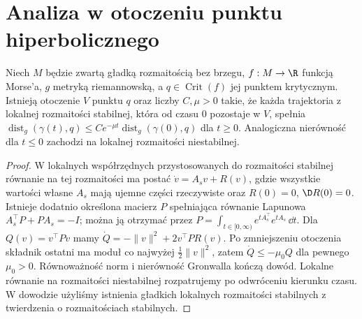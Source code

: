 \section{Analiza w otoczeniu punktu hiperbolicznego}
\begin{lemat}
\label{lem:morse-exponential-v11}
Niech $M$ będzie zwartą gładką rozmaitością bez brzegu,
$f:M\to\R$ funkcją Morse'a, $g$ metryką riemannowską,
a $q\in\operatorname{Crit}(f)$ jej punktem krytycznym.
Istnieją otoczenie $V$ punktu $q$ oraz liczby $C,\mu>0$
takie, że każda trajektoria z lokalnej rozmaitości stabilnej,
która od czasu $0$ pozostaje w $V$, spełnia
$\operatorname{dist}_g(\gamma(t),q)\le
C e^{-\mu t}\operatorname{dist}_g(\gamma(0),q)$ dla $t\ge0$.
Analogiczna nierówność dla $t\le0$ zachodzi na lokalnej
rozmaitości niestabilnej.
\end{lemat}
\begin{proof}
W lokalnych współrzędnych przystosowanych do rozmaitości
stabilnej równanie na tej rozmaitości ma postać
$\dot v=A_sv+R(v)$, gdzie wszystkie wartości własne
$A_s$ mają ujemne części rzeczywiste oraz $R(0)=0$,
$\D R(0)=0$. Istnieje dodatnio określona macierz $P$
spełniająca równanie Lapunowa
$A_s^\top P+PA_s=-I$; można ją otrzymać przez
$P=\int_{t\in[0,\infty)}e^{tA_s^\top}e^{tA_s}\,\dd t$.
Dla $Q(v)=v^\top Pv$ mamy
$\dot Q=-\|v\|^2+2v^\top PR(v)$.
Po zmniejszeniu otoczenia składnik ostatni ma moduł
co najwyżej $\frac12\|v\|^2$, zatem
$\dot Q\le-\mu_0 Q$ dla pewnego $\mu_0>0$.
Równoważność norm i nierówność Gronwalla kończą dowód.
Lokalne równanie na rozmaitości niestabilnej rozpatrujemy
po odwróceniu kierunku czasu. W dowodzie użyliśmy istnienia
gładkich lokalnych rozmaitości stabilnych z twierdzenia
o rozmaitościach stabilnych.
\end{proof}

